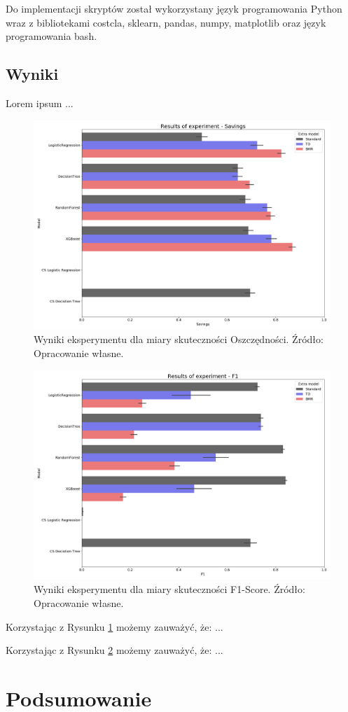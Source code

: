 \documentclass[inzynierska]{pwr_wmat_praca_dyplomowa}
\theoremstyle{plain}
\numberwithin{theorem}{chapter}
\theoremstyle{definition}
\numberwithin{theorem}{chapter}
\begin{document}
Do implementacji skryptów został wykorzystany język programowania Python wraz z bibliotekami costcla, sklearn, pandas, numpy, matplotlib oraz język programowania bash.

\section{Wyniki}
Lorem ipsum ...

\begin{figure}[h]
	\includegraphics[width=\linewidth]{images/100_config1-Savings.png}
	\caption{Wyniki eksperymentu dla miary skuteczności Oszczędności. Źródło: Opracowanie własne.}	
	\label{fig:results-savings}
\end{figure}

\begin{figure}[h]
	\includegraphics[width=\linewidth]{images/100_config1-F1.png}
	\caption{Wyniki eksperymentu dla miary skuteczności F1-Score. Źródło: Opracowanie własne.}
	\label{fig:results-f1}
\end{figure}

Korzystając z Rysunku \ref{fig:results-savings} możemy zauważyć, że: ...

Korzystając z Rysunku \ref{fig:results-f1} możemy zauważyć, że: ...	


\chapter*{Podsumowanie}


\nocite{*}

\end{document}
